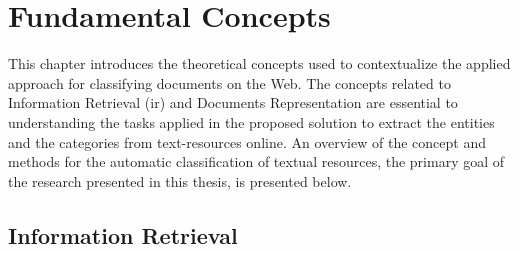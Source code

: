 \chapter{\hspace*{3pt} Fundamental Concepts}
\label{chapter:related-concepts}


This chapter introduces the theoretical concepts used to contextualize the applied approach for classifying documents on the Web.
The concepts related to Information Retrieval (\gls{ir}) and Documents Representation are essential to understanding the tasks applied in the proposed solution to extract the entities and the categories from text-resources online.
An overview of the concept and methods for the automatic classification of textual resources, the primary goal of the research presented in this thesis, is presented below. 








\section{\hspace{3pt}Information Retrieval}

